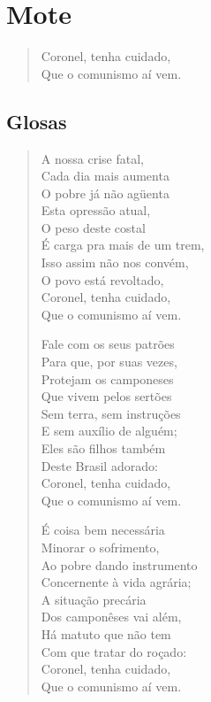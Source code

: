 \chapter{Mote}

\begin{verse}
Coronel, tenha cuidado,\\
Que o comunismo aí vem.
\end{verse}

\section*{Glosas}

\begin{verse}
A nossa crise fatal,\\
Cada dia mais aumenta\\
O pobre já não agüenta\\
Esta opressão atual,\\
O peso deste costal\\
É carga pra mais de um trem,\\
Isso assim não nos convém,\\
O povo está revoltado,\\
Coronel, tenha cuidado,\\
Que o comunismo aí vem.

Fale com os seus patrões\\
Para que, por suas vezes,\\
Protejam os camponeses\\
Que vivem pelos sertões\\
Sem terra, sem instruções\\
E sem auxílio de alguém;\\
Eles são filhos também\\
Deste Brasil adorado:\\
Coronel, tenha cuidado,\\
Que o comunismo aí vem.

É coisa bem necessária\\
Minorar o sofrimento,\\
Ao pobre dando instrumento\\
Concernente à vida agrária;\\
A situação precária\\
Dos camponêses vai além,\\
Há matuto que não tem\\
Com que tratar do roçado:\\
Coronel, tenha cuidado,\\
Que o comunismo aí vem.


\end{verse}
